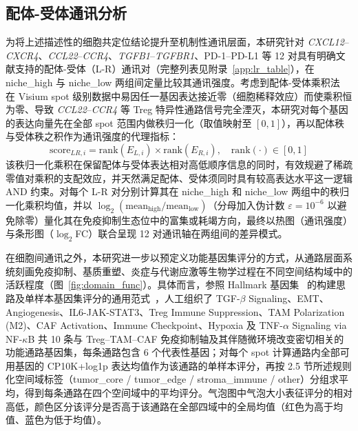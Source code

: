 \documentclass[12pt, a4paper]{ctexart}
\begin{document}
\subsection{配体-受体通讯分析}

为将上述描述性的细胞共定位结论提升至机制性通讯层面，本研究针对 \textit{CXCL12}--\textit{CXCR4}、\textit{CCL22}--\textit{CCR4}、\textit{TGFB1}--\textit{TGFBR1}、PD-1--PD-L1 等 12 对具有明确文献支持的配体-受体（L-R）通讯对（完整列表见附录~\ref{app:lr_table}），在 niche\_high 与 niche\_low 两组间定量比较其通讯强度。考虑到配体-受体乘积法~\citep{efremova2020cellphonedb} 在 Visium spot 级别数据中易因任一基因表达接近零（细胞稀释效应）而使乘积恒为零、导致 \textit{CCL22}--\textit{CCR4} 等 Treg 特异性通路信号完全湮灭，本研究对每个基因的表达向量先在全部 spot 范围内做秩归一化（取值映射至 $[0,1]$），再以配体秩与受体秩之积作为通讯强度的代理指标：
\begin{equation*}
\text{score}_{LR,i} = \text{rank}(E_{L,i}) \times \text{rank}(E_{R,i}), \quad \text{rank}(\cdot) \in [0,1]
\end{equation*}
该秩归一化乘积在保留配体与受体表达相对高低顺序信息的同时，有效规避了稀疏零值对乘积的支配效应，并天然满足配体、受体须同时具有较高表达水平这一逻辑 AND 约束。对每个 L-R 对分别计算其在 niche\_high 和 niche\_low 两组中的秩归一化乘积均值，并以 $\log_2(\text{mean}_{\text{high}}/\text{mean}_{\text{low}})$（分母加入伪计数 $\varepsilon = 10^{-6}$ 以避免除零）量化其在免疫抑制生态位中的富集或耗竭方向，最终以热图（通讯强度）与条形图（$\log_2$FC）联合呈现 12 对通讯轴在两组间的差异模式。

在细胞间通讯之外，本研究进一步以预定义功能基因集评分的方式，从通路层面系统刻画免疫抑制、基质重塑、炎症与代谢应激等生物学过程在不同空间结构域中的活跃程度（图~\ref{fig:domain_func}）。具体而言，参照 Hallmark 基因集~\citep{liberzon2015molecular} 的构建思路及单样本基因集评分的通用范式~\citep{barbie2009systematic}，人工组织了 TGF-$\beta$ Signaling、EMT、Angiogenesis、IL6-JAK-STAT3、Treg Immune Suppression、TAM Polarization (M2)、CAF Activation、Immune Checkpoint、Hypoxia 及 TNF-$\alpha$ Signaling via NF-$\kappa$B 共 10 条与 Treg--TAM--CAF 免疫抑制轴及其伴随微环境改变密切相关的功能通路基因集，每条通路包含 6 个代表性基因；对每个 spot 计算通路内全部可用基因的 CP10K+log1p 表达均值作为该通路的单样本评分，再按 2.5 节所述规则化空间域标签（tumor\_core / tumor\_edge / stroma\_immune / other）分组求平均，得到每条通路在四个空间域中的平均评分。气泡图中气泡大小表征评分的相对高低，颜色区分该评分是否高于该通路在全部四域中的全局均值（红色为高于均值、蓝色为低于均值）。
\end{document}
